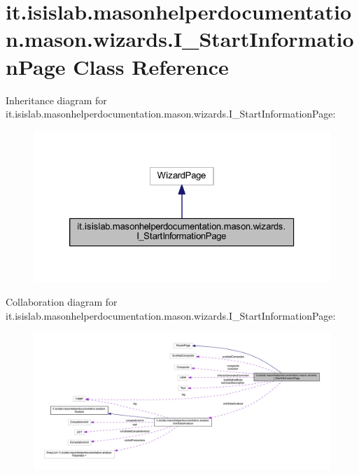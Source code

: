 \hypertarget{classit_1_1isislab_1_1masonhelperdocumentation_1_1mason_1_1wizards_1_1_i___start_information_page}{\section{it.\-isislab.\-masonhelperdocumentation.\-mason.\-wizards.\-I\-\_\-\-Start\-Information\-Page Class Reference}
\label{classit_1_1isislab_1_1masonhelperdocumentation_1_1mason_1_1wizards_1_1_i___start_information_page}
}


Inheritance diagram for it.\-isislab.\-masonhelperdocumentation.\-mason.\-wizards.\-I\-\_\-\-Start\-Information\-Page\-:
\nopagebreak
\begin{figure}[H]
\begin{center}
\leavevmode
\includegraphics[width=326pt]{classit_1_1isislab_1_1masonhelperdocumentation_1_1mason_1_1wizards_1_1_i___start_information_page__inherit__graph}
\end{center}
\end{figure}


Collaboration diagram for it.\-isislab.\-masonhelperdocumentation.\-mason.\-wizards.\-I\-\_\-\-Start\-Information\-Page\-:
\nopagebreak
\begin{figure}[H]
\begin{center}
\leavevmode
\includegraphics[width=350pt]{classit_1_1isislab_1_1masonhelperdocumentation_1_1mason_1_1wizards_1_1_i___start_information_page__coll__graph}
\end{center}
\end{figure}
